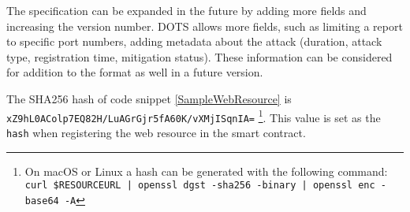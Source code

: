 The specification can be expanded in the future by adding more fields and increasing the version number. DOTS \cite{IETFDraft} allows more fields, such as limiting a report to specific port numbers, adding metadata about the attack (duration, attack type, registration time, mitigation status). These information can be considered for addition to the format as well in a future version.

The SHA256 hash of code snippet \ref{SampleWebResource} is \texttt{xZ9hL0AColp7EQ82H/LuAGrGjr5fA60K/vXMjISqnIA=} \footnote{On macOS or Linux a hash can be generated with the following command: \texttt{curl \$RESOURCEURL | openssl dgst -sha256 -binary | openssl enc -base64 -A}}. This value is set as the \texttt{hash} when registering the web resource in the smart contract.
